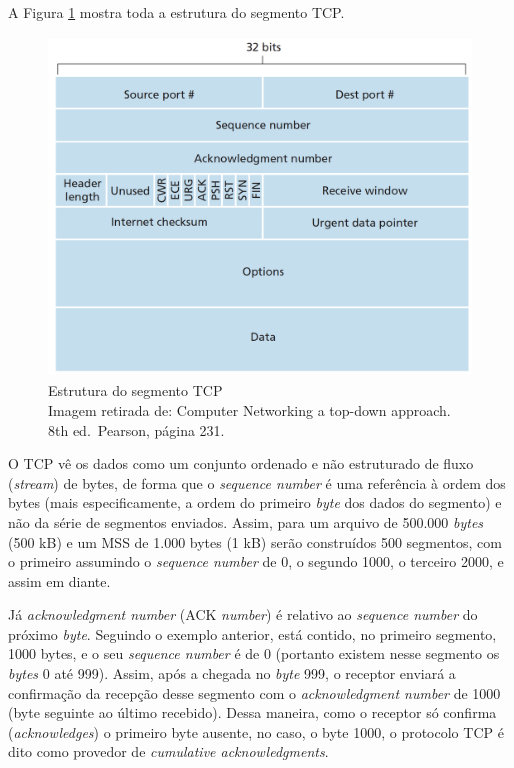 A Figura \ref{Estrutura do segmento TCP} mostra toda a estrutura do segmento TCP.


\begin{figure}[h!]
\centering
\includegraphics[keepaspectratio, width=12cm, height=9cm]{imagens/12/12 - Estrutura segmento TCP.png}
\caption{Estrutura do segmento TCP \\
Imagem retirada de: Computer Networking a top-down approach. 8th
ed.~Pearson, página 231. \\}
\label{Estrutura do segmento TCP}
\end{figure}



\hypertarget{sequuxeancia-e-ack}{%
\label{sequuxeancia-e-ack}}

O TCP vê os dados como um conjunto ordenado e não estruturado de fluxo
(\emph{stream}) de bytes, de forma que o \emph{sequence number} é uma
referência à ordem dos bytes (mais especificamente, a ordem do primeiro
\emph{byte} dos dados do segmento) e não da série de segmentos enviados.
Assim, para um arquivo de 500.000 \emph{bytes} (500 kB) e um MSS de
1.000 bytes (1 kB) serão construídos 500 segmentos, com o primeiro
assumindo o \emph{sequence number} de 0, o segundo 1000, o terceiro
2000, e assim em diante.

Já \emph{acknowledgment number} (ACK \emph{number}) é relativo ao
\emph{sequence number} do próximo \emph{byte}. Seguindo o exemplo
anterior, está contido, no primeiro segmento, 1000 bytes, e o seu
\emph{sequence number} é de 0 (portanto existem nesse segmento os
\emph{bytes} 0 até 999). Assim, após a chegada no \emph{byte} 999, o
receptor enviará a confirmação da recepção desse segmento com o
\emph{acknowledgment number} de 1000 (byte seguinte ao último recebido).
Dessa maneira, como o receptor só confirma (\emph{acknowledges}) o
primeiro byte ausente, no caso, o byte 1000, o protocolo TCP é dito como
provedor de \emph{cumulative acknowledgments}.

